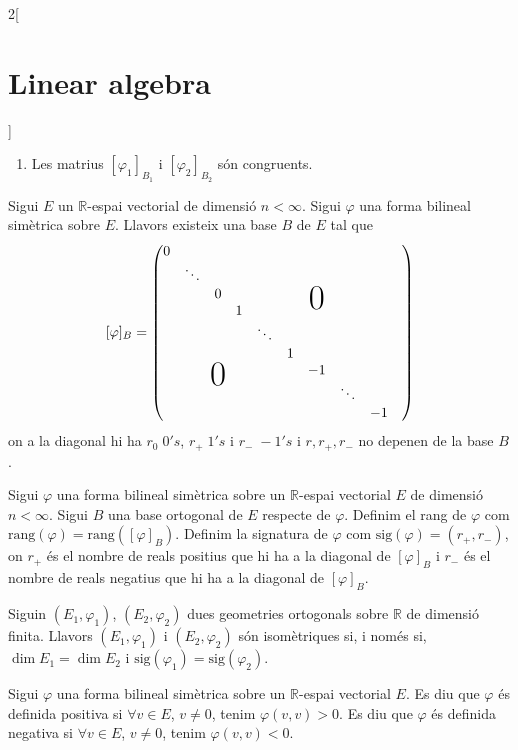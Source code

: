 \documentclass[../../../main.tex]{subfiles}
\begin{document}
\begin{multicols}{2}[\section{Linear algebra}]
\begin{prop}
\begin{enumerate}
    \item Les matrius $[\varphi_1]_{B_1}$ i $[\varphi_2]_{B_2}$ són congruents.
\end{enumerate}
\end{prop}
\begin{theorem}
Sigui $E$ un $\mathbb{R}$-espai vectorial de dimensió $n<\infty$. Sigui $\varphi$ una forma bilineal simètrica sobre $E$. Llavors existeix una base $B$ de $E$ tal que $$[\varphi]_B=\begin{pmatrix}
0 &&&&&&&&&\\
& \ddots&&&&&&&\\
&& 0&&&&\bigzero&&\\
&&& 1 &&&&&\\
&&&& \ddots &&&&\\
&&&&& 1 &&&\\
&&\bigzero&&&& -1 &&\\
&&&&&&&\ddots &\\
&&&&&&&& -1
\end{pmatrix}$$
on a la diagonal hi ha $r_0\;0's$, $r_+\;1's$ i $r_-\;-1's$ i $r,r_+,r_-$ no depenen de la base $B$.
\end{theorem}
\begin{definition}
Sigui $\varphi$ una forma bilineal simètrica sobre un $\mathbb{R}$-espai vectorial $E$ de dimensió $n<\infty$. Sigui $B$ una base ortogonal de $E$ respecte de $\varphi$. Definim el rang de $\varphi$ com $\text{rang}(\varphi)=\text{rang}([\varphi]_B)$. Definim la signatura de $\varphi$ com $\text{sig}(\varphi)=(r_+,r_-)$, on $r_+$ és el nombre de reals positius que hi ha a la diagonal de $[\varphi]_B$ i $r_-$ és el nombre de reals negatius que hi ha a la diagonal de $[\varphi]_B$.
\end{definition}
\begin{theorem}
Siguin $(E_1,\varphi_1)$, $(E_2,\varphi_2)$ dues geometries ortogonals sobre $\mathbb{R}$ de dimensió finita. Llavors $(E_1,\varphi_1)$ i $(E_2,\varphi_2)$ són isomètriques si, i només si, $\dim E_1=\dim E_2$ i $\text{sig}(\varphi_1)=\text{sig}(\varphi_2)$.
\end{theorem}
\begin{definition}
Sigui $\varphi$ una forma bilineal simètrica sobre un $\mathbb{R}$-espai vectorial $E$. Es diu que $\varphi$ és definida positiva si $\forall v\in E$, $v\ne 0$, tenim $\varphi(v,v)>0$. Es diu que $\varphi$ és definida negativa si $\forall v\in E$, $v\ne 0$, tenim $\varphi(v,v)<0$. 
\end{definition}

\end{multicols}
\end{document}
